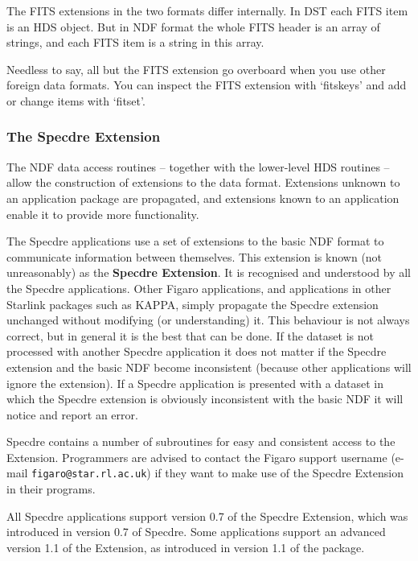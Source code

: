 \documentclass[11pt,twoside]{article}
\newcommand{\htmlref}[2]{#1}
\newcommand{\xref}[3]{#1}
\newcommand{\xlabel}[1]{}
\begin{document}
   The FITS extensions in the two formats differ internally. In DST each
   FITS item is an HDS object. But in NDF format the whole FITS header
   is an array of strings, and each FITS item is a string in this array.

   Needless to say, all but the FITS extension go overboard when
   you use other foreign data formats. You can inspect the FITS
   extension with `fitskeys' and add or change items with `fitset'.


\subsubsection{\label{specextens}\xlabel{extension}The Specdre Extension}

   The
\xref{NDF data access routines}{sun33}{}
   -- together with the lower-level
\xref{HDS routines}{sun92}{}
   -- allow the construction of extensions to the data format.
   Extensions unknown to an application package are propagated, and
   extensions known to an application enable it to provide more
   functionality.

   The Specdre applications use a set of extensions to the basic NDF
   format to communicate information between themselves.  This
   extension is known (not unreasonably) as the \htmlref{{\bf Specdre
   Extension}}{extension}.  It is recognised and understood by all the
   Specdre applications.  Other Figaro applications, and applications
   in other Starlink packages such as KAPPA, simply propagate the
   Specdre extension unchanged without modifying (or understanding) it.
   This behaviour is not always correct, but in general it is the best
   that can be done.  If the dataset is not processed with another
   Specdre application it does not matter if the Specdre extension and
   the basic NDF become inconsistent (because other applications will
   ignore the extension).  If a Specdre application is presented with
   a dataset in which the Specdre extension is obviously inconsistent
   with the basic NDF it will notice and report an error.

   Specdre contains a number of subroutines for easy and consistent
   access to the Extension. Programmers are advised to contact the
   Figaro support username (e-mail {\tt figaro@star.rl.ac.uk}) if they want
   to make use of the Specdre Extension in their programs.

   All Specdre applications support version 0.7 of the Specdre
   Extension, which was introduced in version 0.7 of Specdre. Some
   applications support an advanced version 1.1 of the Extension, as
   introduced in version 1.1 of the package.
\end{document}
